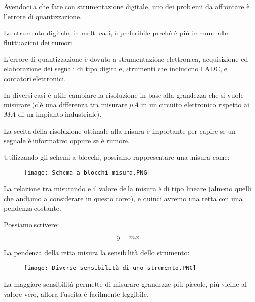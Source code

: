 Avendoci a che fare con strumentazione digitale, uno dei problemi da affrontare è l'errore di quantizzazione. \newline 

Lo strumento digitale, in molti casi, è preferibile perché è più immune alle fluttuazioni dei rumori. \newline 

L'errore di quantizzazione è dovuto a strumentazione elettronica, acquisizione ed elaborazione dei segnali di tipo digitale, strumenti che includono l'ADC, e contatori elettronici. \newline 

In diversi casi è utile cambiare la risoluzione in base alla grandezza che si vuole misurare (c'è una differenza tra misurare $ \mu A$ in un circuito elettronico rispetto ai $M A$ di un impianto industriale). \newline 

La scelta della risoluzione ottimale alla misura è importante per capire se un segnale è informativo oppure se è rumore. \newline 

Utilizzando gli schemi a blocchi, possiamo rappresentare una misura come: 

\begin{figure}[h]
    \centering
    \texttt{[image: Schema a blocchi misura.PNG]}
\end{figure} 

La relazione tra misurando e il valore della misura è di tipo lineare (almeno quelli che andiamo a considerare in questo corso), e quindi avremo una retta con una pendenza costante. \newline 

Possiamo scrivere: 

{
    \Large 
    \begin{equation}
        y = mx
    \end{equation}
    
}

La pendenza della retta misura la sensibilità dello strumento:

\begin{figure}[h]
    \centering
    \texttt{[image: Diverse sensibilità di uno strumento.PNG]}
\end{figure} 

La maggiore sensibilità permette di misurare grandezze più piccole, più vicine al valore vero, 
allora l'uscita è facilmente leggibile. \newline 

